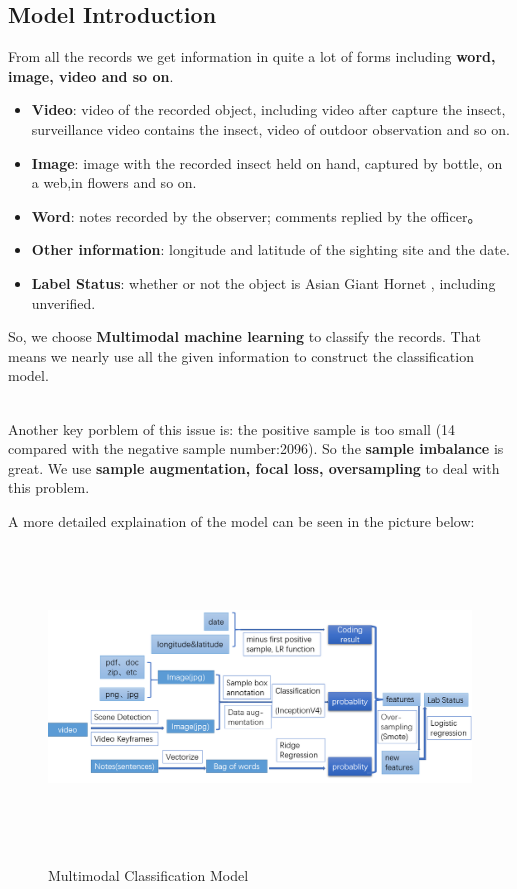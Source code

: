 \documentclass[12pt]{article}
\begin{document}
\subsection{Model Introduction}
From all the records we get information in quite a lot of forms including \textbf{word, image, video and so on}.
\begin{itemize}
	\item \textbf{Video}: video of the recorded object, including video after capture the insect, surveillance video contains the insect, video of outdoor observation and so on.
	\item \textbf{Image}: image with the recorded insect held on hand, captured by bottle, on a web,in flowers and so on.
	\item \textbf{Word}: notes recorded by the observer; comments replied by the officer。
	\item \textbf{Other information}: longitude and latitude of the sighting site and the date.
	\item \textbf{Label Status}: whether or not the object is Asian Giant Hornet , including unverified.
\end{itemize}

So, we choose \textbf{Multimodal machine learning} to classify the records.
That means we nearly use all the given information to construct the classification model.

\quad \\
Another key porblem of this issue is: the positive sample is too small (14 compared with the negative sample number:2096). So the \textbf{sample imbalance} is great. We use \textbf{sample augmentation, focal loss, oversampling} to deal with this problem.

A more detailed explaination of the model can be seen in the picture below:
\begin{figure}[H]
	\centering
	\includegraphics[width=18cm,height=8cm]{./pictures/problem2.png}\label{overall}
	\caption{Multimodal Classification Model}
\end{figure}
\end{document}
